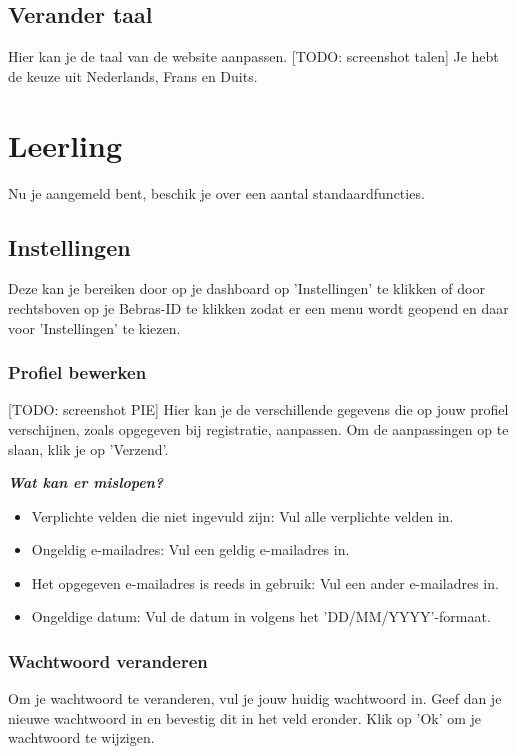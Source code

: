 \documentclass[]{article}
\begin{document}
\subsection{Verander taal}
Hier kan je de taal van de website aanpassen. [TODO: screenshot talen] Je hebt de keuze uit Nederlands, Frans en Duits.

\section{Leerling}

Nu je aangemeld bent, beschik je over een aantal standaardfuncties.

\subsection{Instellingen}

Deze kan je bereiken door op je dashboard op 'Instellingen' te klikken of door rechtsboven op je Bebras-ID te klikken zodat er een menu wordt geopend en daar voor 'Instellingen' te kiezen.

\subsubsection{Profiel bewerken}
[TODO: screenshot PIE] Hier kan je de verschillende gegevens die op jouw profiel verschijnen, zoals opgegeven bij registratie, aanpassen. Om de aanpassingen op te slaan, klik je op 'Verzend'.

\textbf{\textit{Wat kan er mislopen?}}

\begin{itemize}
\item Verplichte velden die niet ingevuld zijn: Vul alle verplichte velden in.
\item Ongeldig e-mailadres: Vul een geldig e-mailadres in.
\item Het opgegeven e-mailadres is reeds in gebruik: Vul een ander e-mailadres in.
\item Ongeldige datum: Vul de datum in volgens het 'DD/MM/YYYY'-formaat.
\end{itemize}

\subsubsection{Wachtwoord veranderen}
Om je wachtwoord te veranderen, vul je jouw huidig wachtwoord in. Geef dan je nieuwe wachtwoord in en bevestig dit in het veld eronder. Klik op 'Ok' om je wachtwoord te wijzigen.
\end{document}
